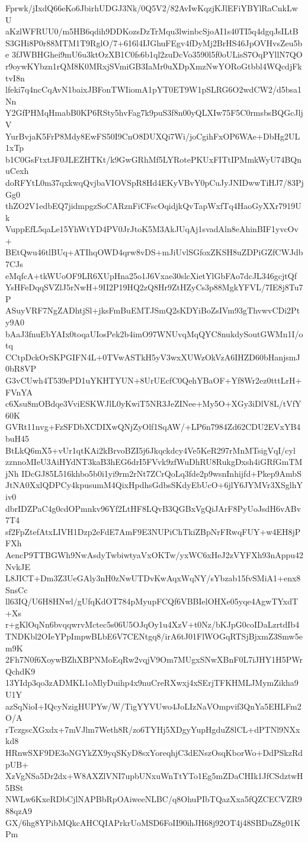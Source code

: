 Fprwk/jIxdQ66eKo6JbirhUDGJ3Nk/0Q5V2/82AvIwKqzjKJlEFiYBYlRaCnkLwU
aKzlWFRUU0/m5HB6qdih9DDKozsDzTrMqu3lwinbcSjoAI1s40TI5q4dgqJsILtB
S3GHi8P0r88MTM1T9RglO/7+616l4IJGhuFEgv4fDyMj2BrHS46JpOVHvsZeu5be
3fJWBHGhei9mU6u3ktOzXB1C0fs6b1ql2zuDcVo3590l5f0oULisS7OqPYllN7QO
r9oywKYbzn1rQM8K0MRxjSVmiGB3IaMr0uXDpXmzNwYORoGtbbl4WQcdjFktvI8n
lfeki7q4ncCqAvN1baixJBFonTWIiomA1pYT0ET9W1pSLRG6O2wdCW2/d5bsa1Nn
Y2GfPHMqHmabB0KP6RSty5hvFag7k9puS3f8n00yQLXIw75F5C0rmsbsBQGcJljV
YurBvjaK5FrP8Mdy8EwFS50I9CnO8DUXQi7Wi/joCgihFxOP6WAe+DbHg2UL1xTp
b1C0GsFtxtJF0JLEZHTKt/k9GwGRhMf5LYRotePKUxFITtIPMmkWyU74BQnuCexh
doRFYtL0m37qxkwqQvjbaVIOVSpR8Hd4EKyVBvY0pCuJyJNIDwwTiHJ7/83PjGg0
thZO2V1edbEQ7jidmpgzSoCARznFiCFscOqidjkQvTapWxfTq4HaoGyXXr7919Uk
VuppEfL5qaLe15YhWtYD4PV0JrJtoK5M3AkJUqAj1svadAln8eAhinBIF1yvcOv+
BEtQwu46tlBUq+ATIhqOWD4qrw8vDS+mJiUvlSGfoxZKSH8uZDPiGZfCWJdb7CJs
eMqfcA+tkWUoOF9LR6XUpHna25o1J6Vxae30slcXietYlGbFAo7dcJL346gcjtQf
YsHFeDqqSVZlJ5rNwH+9II2P19HQ2zQ8Hr9ZtHZyCs3p88MgkYFVL/7IE8j8Tu7P
ASuyVRF7NgZADhtjSl+jksFmBuEMTJSmQ2sKDYiBoZsIVm93gThvwvCDi2Pty9A0
bAaJ3fnuEbYAIx0toqaUIosPek2b4imO97WNUvqMqQYC8nukdySoutGWMn1I/otq
CCtpDckOrSKPGIFN4L+0TVwASTkH5yV3wxXUWzOkVzA6IHZD60bHanjsmJ0bR8VP
G3vCUwh4T539ePD1uYKHTYUN+8UrUEcfC0QehYBaOF+Yf8Wr2ez0tttLrH+FVnYA
c6Xsu8mOBdqe3VviESKWJlL0yKwiT5NR3JeZINee+My5O+XGy3iDlV8L/tVfY60K
GVRt11nvg+FzSFDbXCDIXwQNjZyOlf1SqAW/+LP6n7984Zd62CDU2EVxYB4buH45
BtLkQ6mX5+vUr1qtKAi2kBrvoBZI5j6Jkqckdcy4Ve5KeR297rMnMTsigVqI/cyl
zznnoMIeU3AiHYdNT3kaB3hEG6drI5FVvk9zfWuDhRU8RukgDxsh4iGRfGmTMjNh
IDcGJ85L516khbo5b0i1yi9rm2rNt7ZCrQoLq3fde2p9wsnInhijfd+Pkep9AmbS
JtNA0XxlQDPCy4kpusumM4QixHpdhsGdbsSKdyEbUcO+6jlY6JYMVr3XSglhYiv0
dbrIDZPaC4g0cdOPmnkv96Yf2LtHF8LQvB3QGBxVgQiJArF8PyUoJsdH6vABv7T4
sf2FpZtefAtxLIVH1Dzp2eFdE7AmF9E3NUPiChTkiZBpNrFRwqFUY+w4EH8jPFXh
AencP9TTBGWh9NwAsdyTwbiwtyaVxOKTw/yxWC6xHeJ2zVYFXh93nAppu42NvkJE
L8JICT+Dm3Z3UeGAly3nH0zNwUTDvKwAqxWqNY/sYbzab15fvSMiA1+enx8SnsCc
ll63IQ/U6H8HNwl/gUfqKdOT784pMyupFCQf6VBBIelOHXe05yqe4AgwTYxdT+Xs
r+gKlOqNn6bvqqwrvMctec5s06U5OJqOy1u4XzV+t0Nz/bKJpG0coIDaLzrtdIb4
TNDKbl2OIeYPpImpwBLbE6V7CENtgq8/irA6tJ01FlWOGqRTSjBjxmZ3Smw5em9K
2Fh7N0f6XoywBZhXBPNMoEqRw2vqjV9Om7MUgxSNwXBnF0L7iJHY1H5PWrQchdK9
13YIdp3qo3zADMKL1oMlyDuihp4x9nuCreRXwxj4xSErjTFKHMLJMymZikha9U1Y
azSqNioI+IQcyNzigHUPYw/W/TigYYVUwo4JoLIzNaVOmpvif3QnYa5EHLFm2O/A
rTczgscXGxdx+7mVJlm7Weth8R/zo6TYHj5XDgyYupHgduZ8lCL+dPTNl9NXxkd8
HRnwSXF9DE3oNGYkZX9yqSKyD8sxYoreqhjC3dENszOsqKborWo+DdPSkzRdpUB+
XzVgNSa5Dr2dx+W8AXZlVNI7upbUNxuWnTtYTo1Eg5mZDaCHIk1JfCSdztwH5BSt
NWLw6KxeRDbCjlNAPBbRpOAiweeNLBC/q8OhuPIbTQazXxa5fQZCECVZR988qzA9
GX/6hg8YPibMQkcAHCQIAPrkrUoMSD6FoII90ihJH68j92OT4j48SBDuZ8g01KPm
